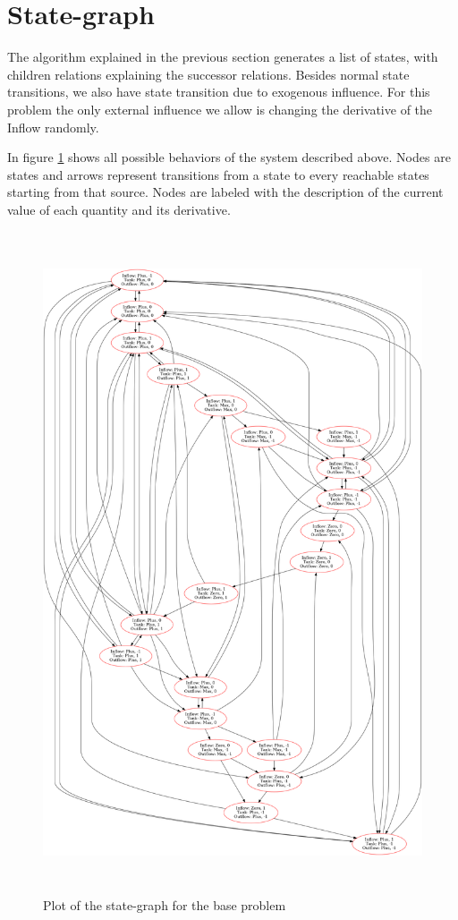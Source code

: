 \documentclass[a4paper]{article}
\begin{document}
\section{State-graph}
The algorithm explained in the previous section generates a list of states, with children relations explaining the successor relations. Besides normal state transitions, we also have state transition due to exogenous influence. For this problem the only external influence we allow is changing the derivative of the Inflow randomly.

In figure \ref{state-graph-base} shows all possible behaviors of the system described above. Nodes are states and arrows represent transitions from a state to every reachable states starting from that source. Nodes are labeled with the description of the current value of each quantity and its derivative.

\begin{figure}[H]\label{state-graph-base}
\centering
\includegraphics[width=\textwidth,height=7.7in,keepaspectratio]{result_base_problem.png}
\caption{Plot of the state-graph for the base problem}
\end{figure}
\end{document}
